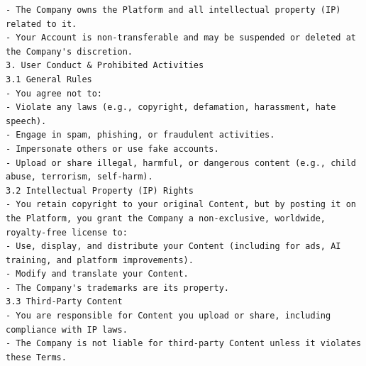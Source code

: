 \documentclass[manuscript,review,anonymous]{acmart}
\begin{document}
\begin{lstlisting}[frame=single,upquote=false,breaklines=true,columns=fullflexible,columns=fullflexible,columns=fullflexible,breakindent=0pt,basicstyle=\ttfamily\small]
- The Company owns the Platform and all intellectual property (IP) related to it.
- Your Account is non-transferable and may be suspended or deleted at the Company's discretion.
3. User Conduct & Prohibited Activities
3.1 General Rules
- You agree not to:
- Violate any laws (e.g., copyright, defamation, harassment, hate speech).
- Engage in spam, phishing, or fraudulent activities.
- Impersonate others or use fake accounts.
- Upload or share illegal, harmful, or dangerous content (e.g., child abuse, terrorism, self-harm).
3.2 Intellectual Property (IP) Rights
- You retain copyright to your original Content, but by posting it on the Platform, you grant the Company a non-exclusive, worldwide, royalty-free license to:
- Use, display, and distribute your Content (including for ads, AI training, and platform improvements).
- Modify and translate your Content.
- The Company's trademarks are its property.
3.3 Third-Party Content
- You are responsible for Content you upload or share, including compliance with IP laws.
- The Company is not liable for third-party Content unless it violates these Terms.


\end{lstlisting}
\end{document}
